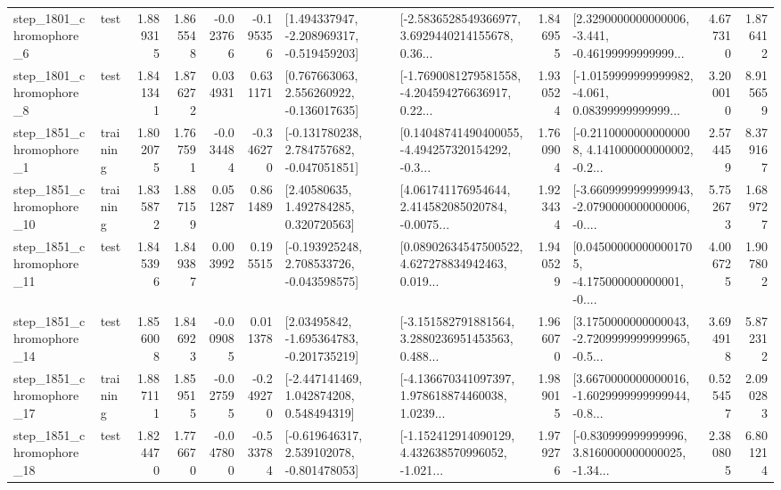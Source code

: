 \begin{tabular}{llrrrrllrlrr}
  step\_1801\_chromophore\_6 &      test &      1.889315 &    1.865548 &     -0.023766 & -0.195356 &   [1.494337947, -2.208969317, -0.519459203] &  [-2.5836528549366977, 3.6929440214155678, 0.36... &       1.846955 &  [2.3290000000000006, -3.441, -0.46199999999999... &            4.677310 &          1.876412 \\
  step\_1801\_chromophore\_8 &      test &      1.841341 &    1.876272 &      0.034931 &  0.631171 &    [0.767663063, 2.556260922, -0.136017635] &  [-1.7690081279581558, -4.204594276636917, 0.22... &       1.930524 &  [-1.0159999999999982, -4.061, 0.08399999999999... &            3.200010 &          8.915659 \\
  step\_1851\_chromophore\_1 &  training &      1.802075 &    1.767591 &     -0.034484 & -0.346270 &   [-0.131780238, 2.784757682, -0.047051851] &  [0.14048741490400055, -4.494257320154292, -0.3... &       1.760904 &  [-0.21100000000000008, 4.141000000000002, -0.2... &            2.574459 &          8.379167 \\
 step\_1851\_chromophore\_10 &  training &      1.835872 &    1.887159 &      0.051287 &  0.861489 &      [2.40580635, 1.492784285, 0.320720563] &  [4.061741176954644, 2.414582085020784, -0.0075... &       1.923434 &  [-3.6609999999999943, -2.0790000000000006, -0.... &            5.752673 &          1.689727 \\
 step\_1851\_chromophore\_11 &      test &      1.845396 &    1.849387 &      0.003992 &  0.195515 &   [-0.193925248, 2.708533726, -0.043598575] &  [0.08902634547500522, 4.627278834942463, 0.019... &       1.940529 &  [0.045000000000001705, -4.175000000000001, -0.... &            4.006725 &          1.907802 \\
 step\_1851\_chromophore\_14 &      test &      1.856008 &    1.846923 &     -0.009085 &  0.011378 &    [2.03495842, -1.695364783, -0.201735219] &  [-3.151582791881564, 3.2880236951453563, 0.488... &       1.966070 &  [3.1750000000000043, -2.7209999999999965, -0.5... &            3.694918 &          5.872312 \\
 step\_1851\_chromophore\_17 &  training &      1.887111 &    1.859515 &     -0.027595 & -0.249270 &    [-2.447141469, 1.042874208, 0.548494319] &  [-4.136670341097397, 1.978618874460038, 1.0239... &       1.989015 &  [3.6670000000000016, -1.6029999999999944, -0.8... &            0.525457 &          2.090283 \\
 step\_1851\_chromophore\_18 &      test &      1.824470 &    1.776670 &     -0.047800 & -0.533784 &   [-0.619646317, 2.539102078, -0.801478053] &  [-1.152412914090129, 4.432638570996052, -1.021... &       1.979276 &  [-0.830999999999996, 3.8160000000000025, -1.34... &            2.380805 &          6.801214 \\

\end{tabular}
